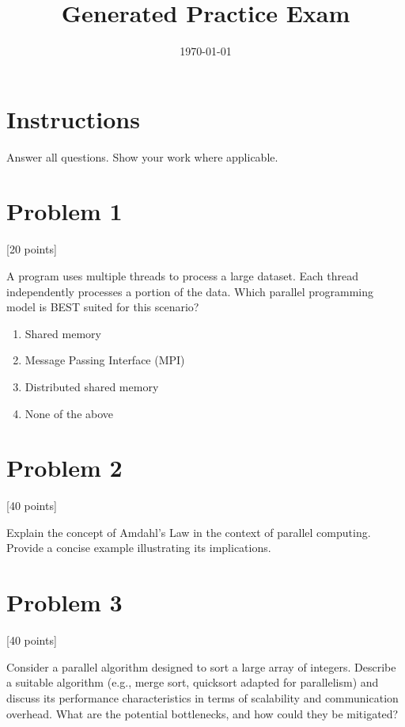\documentclass[12pt]{article}
\title{Generated Practice Exam}
\date{\today}
\begin{document}
\maketitle
\section*{Instructions}
Answer all questions. Show your work where applicable.
\vspace{0.5cm}
\section*{Problem 1} \hfill [20 points]

A program uses multiple threads to process a large dataset.  Each thread independently processes a portion of the data. Which parallel programming model is BEST suited for this scenario?

\begin{enumerate}
\setlength{\itemsep}{0.3cm}
\item Shared memory
\item Message Passing Interface (MPI)
\item Distributed shared memory
\item None of the above
\end{enumerate}

\hrulefill

\section*{Problem 2} \hfill [40 points]

Explain the concept of Amdahl's Law in the context of parallel computing.  Provide a concise example illustrating its implications.

\vspace{3cm}

\hrulefill

\section*{Problem 3} \hfill [40 points]

Consider a parallel algorithm designed to sort a large array of integers.  Describe a suitable algorithm (e.g., merge sort, quicksort adapted for parallelism) and discuss its performance characteristics in terms of scalability and communication overhead.  What are the potential bottlenecks, and how could they be mitigated?

\vspace{3cm}

\hrulefill
\end{document}
